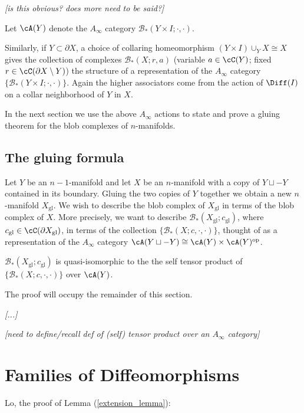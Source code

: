 \documentclass[11pt,leqno]{amsart}
\def\bc{{\mathcal B}}
\def\du{\sqcup}
\def\bd{\partial}
\def\sub{\subset}
\def\setmin{\setminus}
\def\sgl{_\mathrm{gl}}
\def\op{^\mathrm{op}}
\def\nn#1{{{\it \small [#1]}}}
\begin{document}
\nn{is this obvious?  does more need to be said?}

Let $\cA(Y)$ denote the $A_\infty$ category $\bc_*(Y\times I; \cdot, \cdot)$.

Similarly, if $Y \sub \bd X$, a choice of collaring homeomorphism
$(Y\times I) \cup_Y X \cong X$ gives the collection of complexes $\bc_*(X; r, a)$
(variable $a \in \cC(Y)$; fixed $r \in \cC(\bd X \setmin Y)$) the structure of a representation of the
$A_\infty$ category $\{\bc_*(Y\times I; \cdot, \cdot)\}$.
Again the higher associators come from the action of $\Diff(I)$ on a collar neighborhood
of $Y$ in $X$.

In the next section we use the above $A_\infty$ actions to state and prove
a gluing theorem for the blob complexes of $n$-manifolds.


\subsection{The gluing formula}

Let $Y$ be an $n{-}1$-manifold and let $X$ be an $n$-manifold with a copy
of $Y \du -Y$ contained in its boundary.
Gluing the two copies of $Y$ together we obtain a new $n$-manifold $X\sgl$.
We wish to describe the blob complex of $X\sgl$ in terms of the blob complex
of $X$.
More precisely, we want to describe $\bc_*(X\sgl; c\sgl)$,
where $c\sgl \in \cC(\bd X\sgl)$,
in terms of the collection $\{\bc_*(X; c, \cdot, \cdot)\}$, thought of as a representation
of the $A_\infty$ category $\cA(Y\du-Y) \cong \cA(Y)\times \cA(Y)\op$.

\begin{thm}
$\bc_*(X\sgl; c\sgl)$ is quasi-isomorphic to the the self tensor product
of $\{\bc_*(X; c, \cdot, \cdot)\}$ over $\cA(Y)$.
\end{thm}

The proof will occupy the remainder of this section.

\nn{...}

\bigskip

\nn{need to define/recall def of (self) tensor product over an $A_\infty$ category}




\appendix

\section{Families of Diffeomorphisms}  \label{sec:localising}


Lo, the proof of Lemma (\ref{extension_lemma}):
\end{document}
